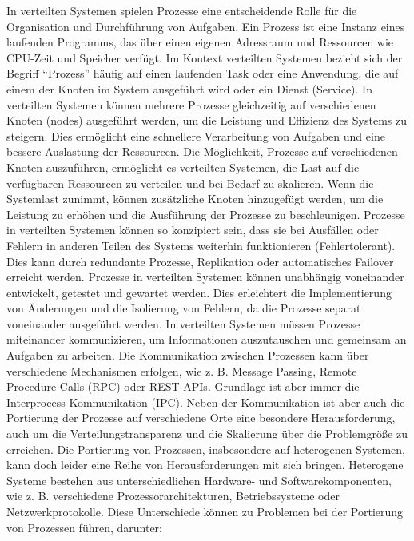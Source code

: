 In verteilten Systemen spielen Prozesse eine entscheidende Rolle für die Organisation und Durchführung von Aufgaben. Ein Prozess ist eine Instanz eines laufenden Programms, das über einen eigenen Adressraum und Ressourcen wie CPU-Zeit und Speicher verfügt. Im Kontext verteilten Systemen bezieht sich der Begriff \enquote{Prozess} häufig auf einen laufenden Task oder eine Anwendung, die auf einem der Knoten im System ausgeführt wird oder ein Dienst (Service). In verteilten Systemen können mehrere Prozesse gleichzeitig auf verschiedenen Knoten (nodes) ausgeführt werden, um die Leistung und Effizienz des Systems zu steigern. Dies ermöglicht eine schnellere Verarbeitung von Aufgaben und eine bessere Auslastung der Ressourcen. Die Möglichkeit, Prozesse auf verschiedenen Knoten auszuführen, ermöglicht es verteilten Systemen, die Last auf die verfügbaren Ressourcen zu verteilen und bei Bedarf zu skalieren. Wenn die Systemlast zunimmt, können zusätzliche Knoten hinzugefügt werden, um die Leistung zu erhöhen und die Ausführung der Prozesse zu beschleunigen. Prozesse in verteilten Systemen können so konzipiert sein, dass sie bei Ausfällen oder Fehlern in anderen Teilen des Systems weiterhin funktionieren (Fehlertolerant). Dies kann durch redundante Prozesse, Replikation oder automatisches Failover erreicht werden. Prozesse in verteilten Systemen können unabhängig voneinander entwickelt, getestet und gewartet werden. Dies erleichtert die Implementierung von Änderungen und die Isolierung von Fehlern, da die Prozesse separat voneinander ausgeführt werden. In verteilten Systemen müssen Prozesse miteinander kommunizieren, um Informationen auszutauschen und gemeinsam an Aufgaben zu arbeiten. Die Kommunikation zwischen Prozessen kann über verschiedene Mechanismen erfolgen, wie z. B. Message Passing, Remote Procedure Calls (RPC) oder REST-APIs. Grundlage ist aber immer die Interprocess-Kommunikation (IPC).
Neben der Kommunikation ist aber auch die Portierung der Prozesse auf verschiedene Orte eine besondere Herausforderung, auch um die Verteilungstransparenz und die Skalierung über die Problemgröße zu erreichen. 
Die Portierung von Prozessen, insbesondere auf heterogenen Systemen, kann doch leider eine Reihe von Herausforderungen mit sich bringen. Heterogene Systeme bestehen aus unterschiedlichen Hardware- und Softwarekomponenten, wie z. B. verschiedene Prozessorarchitekturen, Betriebssysteme oder Netzwerkprotokolle. Diese Unterschiede können zu Problemen bei der Portierung von Prozessen führen, darunter:
